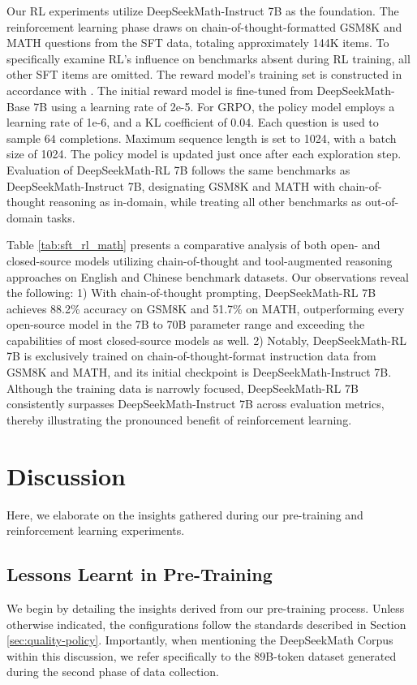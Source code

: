 \begin{itemize}[topsep=0pt]
Our RL experiments utilize DeepSeekMath-Instruct 7B as the foundation. The reinforcement learning phase draws on chain-of-thought-formatted GSM8K and MATH questions from the SFT data, totaling approximately 144K items. To specifically examine RL's influence on benchmarks absent during RL training, all other SFT items are omitted. The reward model’s training set is constructed in accordance with \citep{wang2023math}. The initial reward model is fine-tuned from DeepSeekMath-Base 7B using a learning rate of 2e-5. For GRPO, the policy model employs a learning rate of 1e-6, and a KL coefficient of 0.04. Each question is used to sample $64$ completions. Maximum sequence length is set to 1024, with a batch size of 1024. The policy model is updated just once after each exploration step. Evaluation of DeepSeekMath-RL 7B follows the same benchmarks as DeepSeekMath-Instruct 7B, designating GSM8K and MATH with chain-of-thought reasoning as in-domain, while treating all other benchmarks as out-of-domain tasks.

Table \ref{tab:sft_rl_math} presents a comparative analysis of both open- and closed-source models utilizing chain-of-thought and tool-augmented reasoning approaches on English and Chinese benchmark datasets. Our observations reveal the following: 1) With chain-of-thought prompting, DeepSeekMath-RL 7B achieves 88.2\% accuracy on GSM8K and 51.7\% on MATH, outperforming every open-source model in the 7B to 70B parameter range and exceeding the capabilities of most closed-source models as well. 2) Notably, DeepSeekMath-RL 7B is exclusively trained on chain-of-thought-format instruction data from GSM8K and MATH, and its initial checkpoint is DeepSeekMath-Instruct 7B. Although the training data is narrowly focused, DeepSeekMath-RL 7B consistently surpasses DeepSeekMath-Instruct 7B across evaluation metrics, thereby illustrating the pronounced benefit of reinforcement learning.

\section{Discussion}
Here, we elaborate on the insights gathered during our pre-training and reinforcement learning experiments.

\subsection{Lessons Learnt in Pre-Training}

We begin by detailing the insights derived from our pre-training process. Unless otherwise indicated, the configurations follow the standards described in Section \ref{sec:quality-policy}. Importantly, when mentioning the DeepSeekMath Corpus within this discussion, we refer specifically to the 89B-token dataset generated during the second phase of data collection.


\end{itemize}
